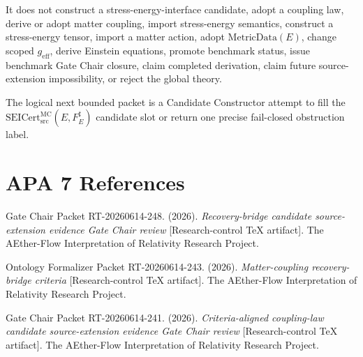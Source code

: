 \documentclass[11pt]{article}
\newcommand{\MetricData}{\mathrm{MetricData}}
\newcommand{\geff}{g_{\mathrm{eff}}}
\newcommand{\SEICert}{\mathrm{SEICert}_{\mathrm{src}}^{\mathrm{MC}}}
\begin{document}
It does not construct a stress-energy-interface candidate, adopt a coupling
law, derive or adopt matter coupling, import stress-energy semantics, construct
a stress-energy tensor, import a matter action, adopt \(\MetricData(E)\),
change scoped \(\geff\), derive Einstein equations, promote benchmark status,
issue benchmark Gate Chair closure, claim completed derivation, claim future
source-extension impossibility, or reject the global theory.

The logical next bounded packet is a Candidate Constructor attempt to fill the
\(\SEICert(E,F_E^\sharp)\) candidate slot or return one precise fail-closed
obstruction label.

\section{APA 7 References}

Gate Chair Packet RT-20260614-248. (2026). \emph{Recovery-bridge candidate
source-extension evidence Gate Chair review} [Research-control TeX artifact].
The AEther-Flow Interpretation of Relativity Research Project.

Ontology Formalizer Packet RT-20260614-243. (2026). \emph{Matter-coupling
recovery-bridge criteria} [Research-control TeX artifact]. The AEther-Flow
Interpretation of Relativity Research Project.

Gate Chair Packet RT-20260614-241. (2026). \emph{Criteria-aligned
coupling-law candidate source-extension evidence Gate Chair review}
[Research-control TeX artifact]. The AEther-Flow Interpretation of Relativity
Research Project.
\end{document}
